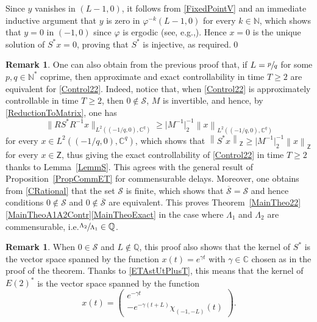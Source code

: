 \documentclass[10pt]{amsart}
\providecommand{\eg}{}
\renewcommand{\eg}{e.g.,\xspace}
\theoremstyle{plain}
\theoremstyle{definition}
\newtheorem{remk}[theo]{Remark}
\newcommand{\norm}[1]{\left\lVert #1\right\lVert}
\newcommand{\nnorm}[1]{\lVert #1\lVert}
\newcommand{\nabs}[1]{\lvert #1 \rvert}
\providecommand{\ie}{i.e.}\providecommand{\etc}{etc.}\providecommand{\resp}{resp.}\providecommand{\cf}{cf.}
\begin{document}
Since $y$ vanishes in $(L - 1, 0)$, it follows from \eqref{FixedPointV} and an immediate inductive argument that $y$ is zero in $\varphi^{-k}(L-1, 0)$ for every $k \in \mathbb N$, which shows that $y = 0$ in $(-1, 0)$ since $\varphi$ is ergodic (see, \eg \cite[Th.\,1.5]{Walters1982Introduction}). Hence $x = 0$ is the unique solution of $S^\ast x = 0$, proving that $S^\ast$ is injective, as required.\qed

\begin{remk}
\label{RemkControlDelayRational}
One can also obtain from the previous proof that, if $L = \sfrac{p}{q}$ for some $p, q \in \mathbb N^\ast$ coprime, then approximate and exact controllability in time $T \geq 2$ are equivalent for \eqref{Control22}. Indeed, notice that, when \eqref{Control22} is approximately controllable in time $T \geq 2$, then $0 \notin \mathcal S$, $M$ is invertible, and hence, by \eqref{ReductionToMatrix}, one has
\[
\nnorm{R S^\ast R^{-1} x}_{L^2\left(\left(-{1}/{q}, 0\right), \mathbb C^q\right)} \geq \nabs{M^{-1}}_{2}^{-1} \norm{x}_{L^2\left(\left(-{1}/{q}, 0\right), \mathbb C^q\right)}
\]
for every $x \in L^2\left(\left(-{1}/{q}, 0\right), \mathbb C^q\right)$,
which shows that $\norm{S^\ast x}_{\mathsf Z} \geq \nabs{M^{-1}}_{2}^{-1} \norm{x}_{\mathsf Z}$ for \hbox{every} $x \in \mathsf Z$, thus giving the exact controllability of \eqref{Control22} in time $T \geq 2$ thanks to Lemma~\ref{LemmS}. This agrees with the general result of Proposition~\ref{PropCommET} for commensurable delays. Moreover, one obtains from \eqref{CRational} that the set $\mathcal S$ is finite, which shows that $\overline{\mathcal S} = \mathcal S$ and hence conditions $0 \notin \mathcal S$ and $0 \notin \overline{\mathcal S}$ are equivalent. This proves Theorem~\ref{MainTheo22}\eqref{MainTheoA1A2Contr}\eqref{MainTheoExact} in the case where $\Lambda_1$ and $\Lambda_2$ are commensurable, \ie $\sfrac{\Lambda_2}{\Lambda_1} \in \mathbb Q$.
\end{remk}

\begin{remk}
When $0 \in \mathcal S$ and $L \notin \mathbb Q$, this proof also shows that the kernel of $S^\ast$ is the vector space spanned by the function $x(t) = e^{\gamma t}$ with $\gamma \in \mathbb C$ chosen as in the proof of the theorem. Thanks to \eqref{ETAstUtPlusT}, this means that the kernel of $E(2)^\ast$ is the vector space spanned by the function
\[
x(t) =
\begin{pmatrix}
e^{-\gamma t} \\
-e^{-\gamma(t + L)} \chi_{(-1, -L)}(t)
\end{pmatrix}.
\]
\end{remk}
\end{document}
